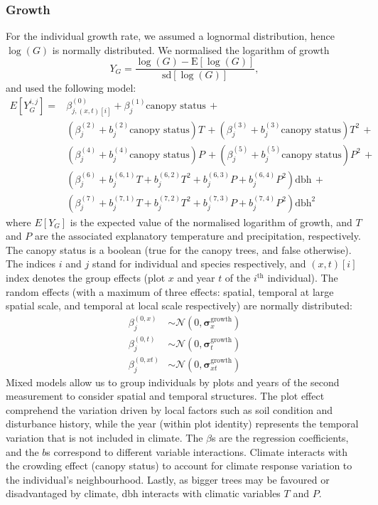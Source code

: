 \subsubsection{Growth}
For the individual growth rate, we assumed a lognormal distribution, hence $ \log(G) $ is normally distributed. We normalised the logarithm of growth
\[
	Y_{G} = \frac{\log(G) - \mathrm{E}[\log(G)]}{\mathrm{sd}[\log(G)]},
\]
and used the following model:
\begin{equation} \label{eq::glmm_growth}
\begin{split}
	E[Y_G^{i, j}] = & \beta_{j, (x, t)[i]}^{(0)} + \beta_j^{(1)}  \text{canopy status} \, + \\
	& \left(\beta_j^{(2)} + b_j^{(2)} \text{canopy status} \right) T \, +
	\left(\beta_j^{(3)} + b_j^{(3)} \text{canopy status} \right) T^2 \, + \\
	& \left(\beta_j^{(4)} + b_j^{(4)} \text{canopy status} \right) P \, +
	\left(\beta_j^{(5)} + b_j^{(5)} \text{canopy status} \right) P^2 \, + \\
	& \left( \beta_j^{(6)} + b_j^{(6, 1)} T + b_j^{(6, 2)} T^2 +
		b_j^{(6, 3)} P + b_j^{(6, 4)} P^2 \right) \text{dbh} \, + \\
	& \left( \beta_j^{(7)} + b_j^{(7, 1)} T + b_j^{(7, 2)} T^2 +
		b_j^{(7, 3)} P + b_j^{(7, 4)} P^2 \right) \text{dbh}^2
\end{split}
\end{equation}
where $ E[Y_G] $ is the expected value of the normalised logarithm of growth, and $ T $ and $ P $ are the associated explanatory temperature and precipitation, respectively. The canopy status is a boolean (true for the canopy trees, and false otherwise). The indices $ i $ and $ j $ stand for individual and species respectively, and $ (x, t)[i] $ index denotes the group effects (plot $ x $ and year $ t $ of the $ i^{\text{th}} $ individual). The random effects (with a maximum of three effects: spatial, temporal at large spatial scale, and temporal at local scale respectively) are normally distributed:
\begin{align*}
	\beta_{j}^{(0, x)} &\sim \mathcal{N}(0, \bm{\sigma}_{x}^{\text{growth}}) \\
	\beta_{j}^{(0, t)} &\sim \mathcal{N}(0, \bm{\sigma}_{t}^{\text{growth}}) \\
	\beta_{j}^{(0, xt)} &\sim \mathcal{N}(0, \bm{\sigma}_{xt}^{\text{growth}})
\end{align*}
Mixed models allow us to group individuals by plots and years of the second measurement to consider spatial and temporal structures. The plot effect comprehend the variation driven by local factors such as soil condition and disturbance history, while the year (within plot identity) represents the temporal variation that is not included in climate. The $ \beta $s are the regression coefficients, and the $ b $s correspond to different variable interactions. Climate interacts with the crowding effect (canopy status) to account for climate response variation to the individual's neighbourhood. Lastly, as bigger trees may be favoured or disadvantaged by climate, dbh interacts with climatic variables $ T $ and $ P $. \\

